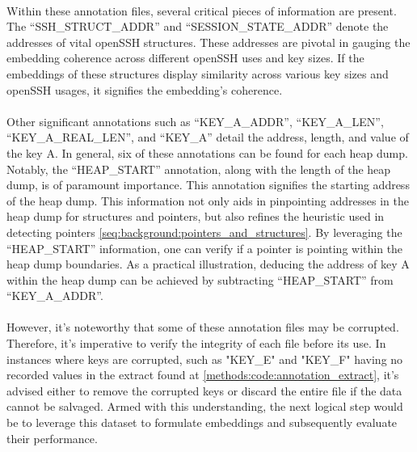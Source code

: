             \paragraph{}Within these annotation files, several critical pieces of information are present. The ``SSH\_STRUCT\_ADDR'' and ``SESSION\_STATE\_ADDR'' denote the addresses of vital openSSH \glspl{structure}. These addresses are pivotal in gauging the embedding coherence across different openSSH uses and key sizes. If the embeddings of these \glspl{structure} display similarity across various key sizes and openSSH usages, it signifies the embedding's coherence.

            \paragraph{}Other significant annotations such as ``KEY\_A\_ADDR'', ``KEY\_A\_LEN'', ``KEY\_A\_REAL\_LEN'', and ``KEY\_A'' detail the address, length, and value of the key A. In general, six of these annotations can be found for each heap dump. Notably, the ``HEAP\_START'' annotation, along with the length of the heap dump, is of paramount importance. This annotation signifies the starting address of the heap dump. This information not only aids in pinpointing addresses in the heap dump for \glspl{structure} and \glspl{pointer}, but also refines the heuristic used in detecting \glspl{pointer} \ref{seq:background:pointers_and_structures}. By leveraging the ``HEAP\_START'' information, one can verify if a \gls{pointer} is pointing within the heap dump boundaries. As a practical illustration, deducing the address of key A within the heap dump can be achieved by subtracting ``HEAP\_START'' from ``KEY\_A\_ADDR''.

            \paragraph{}However, it's noteworthy that some of these annotation files may be corrupted. Therefore, it's imperative to verify the integrity of each file before its use. In instances where keys are corrupted, such as "KEY\_E" and "KEY\_F" having no recorded values in the extract found at \ref{methods:code:annotation_extract}, it's advised either to remove the corrupted keys or discard the entire file if the data cannot be salvaged. Armed with this understanding, the next logical step would be to leverage this dataset to formulate embeddings and subsequently evaluate their performance.


